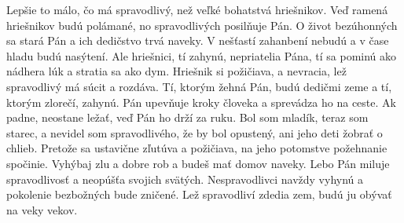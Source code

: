 Lepšie to málo, čo má spravodlivý,
než veľké bohatstvá hriešnikov.
\versseparator
Veď ramená hriešnikov budú polámané,
no spravodlivých posilňuje Pán.
\versseparator
O život bezúhonných sa stará Pán
a ich dedičstvo trvá naveky.
\versseparator
V nešťastí zahanbení nebudú
a v čase hladu budú nasýtení.
\versseparator
Ale hriešnici, tí zahynú,
nepriatelia Pána, tí sa pominú ako nádhera lúk
a stratia sa ako dym.
\versseparator
Hriešnik si požičiava, a nevracia,
lež spravodlivý má súcit a rozdáva.
\versseparator
Tí, ktorým žehná Pán, budú dedičmi zeme
a tí, ktorým zlorečí, zahynú.
\versseparator
Pán upevňuje kroky človeka
a sprevádza ho na ceste.
\versseparator
Ak padne, neostane ležať,
veď Pán ho drží za ruku.
\versseparator
Bol som mladík, teraz som starec,
a nevidel som spravodlivého, že by bol opustený,
ani jeho deti žobrať o chlieb.
\versseparator
Pretože sa ustavične zľutúva a požičiava,
na jeho potomstve požehnanie spočinie.
\versseparator
Vyhýbaj zlu a dobre rob
a budeš mať domov naveky.
\versseparator
Lebo Pán miluje spravodlivosť
a neopúšťa svojich svätých.
\versseparator
Nespravodlivci navždy vyhynú
a pokolenie bezbožných bude zničené.
\versseparator
Lež spravodliví zdedia zem,
budú ju obývať na veky vekov.
